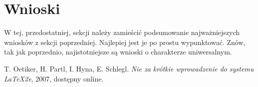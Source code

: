 \documentclass{classrep}
\begin{document}
\section{Wnioski}
{
W tej, przedostatniej, sekcji należy zamieścić podsumowanie najważniejszych
wniosków z sekcji poprzedniej. Najlepiej jest je po prostu wypunktować. Znów,
tak jak poprzednio, najistotniejsze są wnioski o charakterze uniwersalnym.}

\begin{thebibliography}{0}
   T. Oetiker, H. Partl, I. Hyna, E. Schlegl.
    \textsl{Nie za krótkie wprowadzenie do systemu \LaTeX2e}, 2007, dostępny
    online.
\end{thebibliography}
\end{document}
